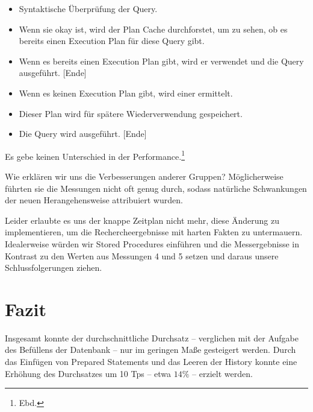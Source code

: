 \documentclass[a4paper, bibliography=totoc, 12pt]{scrartcl}
\begin{document}
\begin{itemize}
\itemsep0pt
\item Syntaktische Überprüfung der Query.
\item Wenn sie okay ist, wird der Plan Cache durchforstet, um zu sehen, ob es bereits einen Execution Plan für diese Query gibt.
\item Wenn es bereits einen Execution Plan gibt, wird er verwendet und die Query ausgeführt. [Ende]
\item Wenn es keinen Execution Plan gibt, wird einer ermittelt.
\item Dieser Plan wird für spätere Wiederverwendung gespeichert.
\item Die Query wird ausgeführt. [Ende]
\end{itemize}

\noindent
Es gebe keinen Unterschied in der Performance.\footnote{Ebd.}

Wie erklären wir uns die Verbesserungen anderer Gruppen? Möglicherweise führten sie die Messungen nicht oft genug durch, sodass natürliche Schwankungen der neuen Herangehensweise attribuiert wurden.

Leider erlaubte es uns der knappe Zeitplan nicht mehr, diese Änderung zu implementieren, um die Rechercheergebnisse mit harten Fakten zu untermauern. Idealerweise würden wir Stored Procedures einführen und die Messergebnisse in Kontrast zu den Werten aus Messungen 4 und 5 setzen und daraus unsere Schlussfolgerungen ziehen.

		
\section{Fazit}
Insgesamt konnte der durchschnittliche Durchsatz --  verglichen mit der Aufgabe des Befüllens der Datenbank -- nur im geringen Maße gesteigert werden. Durch das Einfügen von Prepared Statements und das Leeren der History konnte eine Erhöhung des Durchsatzes um 10 Tps -- etwa $14 \%$ -- erzielt werden.



\end{document}
